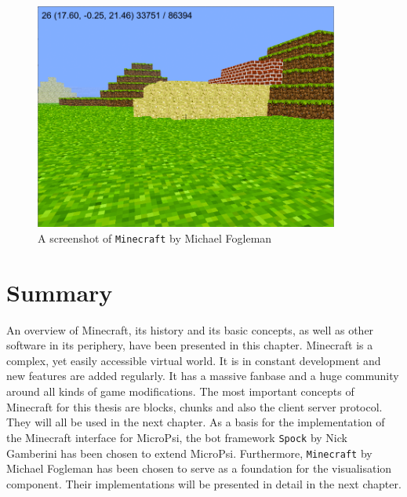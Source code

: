 \begin{figure}[h]
  \centering
    \includegraphics[width=10cm]{graphics/fogleman_mc_screen}
  \caption{A screenshot of \texttt{Minecraft} by Michael Fogleman}
  \label{fogleman_mc_screen}
\end{figure}

    \section{Summary}
An overview of Minecraft, its history and its basic concepts, as well as other software in its periphery, have been presented in this chapter. Minecraft is a complex, yet easily accessible virtual world. It is in constant development and new features are added regularly. It has a massive fanbase and a huge community around all kinds of game modifications. The most important concepts of Minecraft for this thesis are blocks, chunks and also the client server protocol. They will all be used in the next chapter.
As a basis for the implementation of the Minecraft interface for MicroPsi, the bot framework \texttt{Spock} by Nick Gamberini has been chosen to extend MicroPsi.
Furthermore, \texttt{Minecraft} by Michael Fogleman has been chosen to serve as a foundation for the visualisation component. Their implementations will be presented in detail in the next chapter.

